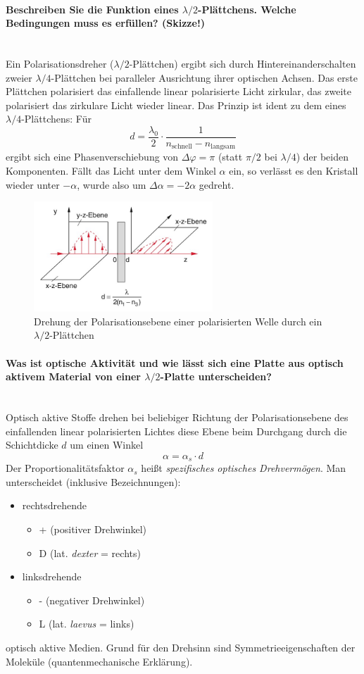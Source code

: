 \documentclass[a4paper, 11pt, ngerman, parskip=half-]{scrartcl}
\newcommand{\myparagraph}[1]{\paragraph{#1}\mbox{}\\}
\begin{document}
\myparagraph{Beschreiben Sie die Funktion eines $\lambda/2$-Plättchens. Welche Bedingungen muss es erfüllen? (Skizze!)}
%
Ein Polarisationsdreher ($\lambda/2$-Plättchen) ergibt sich durch Hintereinanderschalten zweier $\lambda/4$-Plättchen bei paralleler Ausrichtung ihrer optischen Achsen. Das erste Plättchen polarisiert das einfallende linear polarisierte Licht zirkular, das zweite polarisiert das zirkulare Licht wieder linear. Das Prinzip ist ident zu dem eines $\lambda/4$-Plättchens: Für
%
\[d = \frac{\lambda_0}{2} \cdot \frac{1}{n_{\text{schnell}} - n_{\text{langsam}}}\]
%
ergibt sich eine Phasenverschiebung von $\Delta \varphi = \pi$ (statt $\pi/2$ bei $\lambda/4$) der beiden Komponenten. Fällt das Licht unter dem Winkel $\alpha$ ein, so verlässt es den Kristall wieder unter $-\alpha$, wurde also um $\Delta \alpha = -2 \alpha$ gedreht.
%
\begin{figure}[!h]
    \centering
    \begin{samepage}
        \includegraphics[width=0.6\textwidth]{image/15/lambda_halbe.jpg}
        \caption{Drehung der Polarisationsebene einer polarisierten
        Welle durch ein $\lambda/2$-Plättchen}
        \label{fig:lambda_halbe}
    \end{samepage}
\end{figure}


\myparagraph{Was ist optische Aktivität und wie lässt sich eine Platte aus optisch aktivem Material von einer $\lambda/2$-Platte unterscheiden?}
%
Optisch aktive Stoffe drehen bei beliebiger Richtung der Polarisationsebene des einfallenden linear polarisierten Lichtes diese Ebene beim Durchgang durch die Schichtdicke $d$ um einen Winkel
%
\[\alpha = \alpha_s \cdot d\]
%
Der Proportionalitätsfaktor $\alpha_s$ heißt \textit{spezifisches optisches Drehvermögen}. Man unterscheidet (inklusive Bezeichnungen):
\begin{itemize}
    \item rechtsdrehende
    \begin{itemize}
        \item + (positiver Drehwinkel)
        \item D (lat. \textit{dexter} = rechts)
    \end{itemize}
    \item linksdrehende
    \begin{itemize}
        \item - (negativer Drehwinkel)
        \item L (lat. \textit{laevus} = links)
    \end{itemize}
\end{itemize}
optisch aktive Medien. Grund für den Drehsinn sind Symmetrieeigenschaften der Moleküle (quantenmechanische Erklärung).
\end{document}
